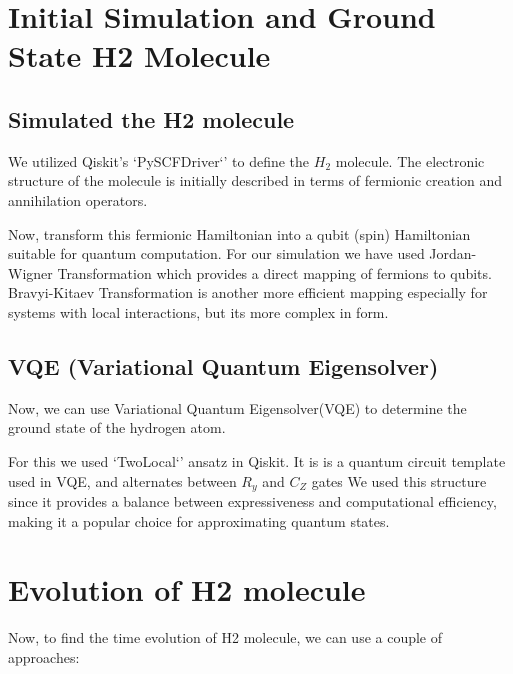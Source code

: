 \documentclass[%
reprint,
 amsmath,amssymb,
 aps,
]{revtex4-2}
\begin{document}
\maketitle


\section{\label{sec:level1}Initial Simulation and Ground State
H2 Molecule}

\subsection{\label{sec:level2} Simulated the H2 molecule}
We utilized Qiskit's `PySCFDriver`' to define the $H_2$ molecule. The electronic structure of the 
molecule is initially described in terms of fermionic creation and annihilation operators. \newline

Now, transform this fermionic Hamiltonian into a qubit (spin) Hamiltonian suitable for quantum computation.
For our simulation we have used Jordan-Wigner Transformation which provides a direct mapping of fermions to qubits.
Bravyi-Kitaev Transformation is another more efficient mapping especially for systems with local interactions, but its more complex in form.



\subsection{\label{sec:level2}VQE (Variational Quantum Eigensolver)}
Now, we can use Variational Quantum Eigensolver(VQE) to determine the ground state of the hydrogen atom.

For this we used `TwoLocal`' ansatz in Qiskit. It is is a quantum circuit template used in VQE, and alternates between $R_y$ and $C_Z$ gates
We used this structure since it provides a balance between expressiveness and computational efficiency, making it a popular choice for approximating quantum states.


\section{\label{sec:level1}Evolution of H2 molecule}

Now, to find the time evolution of H2 molecule, we can use a couple of approaches:
\end{document}
